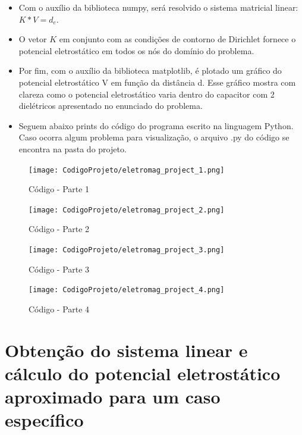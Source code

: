 \documentclass[10pt]{article}
\begin{document}
\begin{itemize}
    \item Com o auxílio da biblioteca numpy, será resolvido o sistema matricial linear: $K*V = d_{e}$.
    \item O vetor $K$ em conjunto com as condições de contorno de Dirichlet fornece o potencial eletrostático em todos os nós do domínio do problema.
    \item Por fim, com o auxílio da biblioteca matplotlib, é plotado um gráfico do potencial eletrostático V em função da distância d. Esse gráfico mostra com clareza como o potencial eletrostático varia dentro do capacitor com 2 dielétricos apresentado no enunciado do problema.
    \item Seguem abaixo prints do código do programa escrito na linguagem Python. Caso ocorra algum problema para visualização, o arquivo .py do código se encontra na pasta do projeto.
    \end{itemize}
    
    \begin{figure}[!htb]
    \centerline{\texttt{[image: CodigoProjeto/eletromag\_project\_1.png]}}
    \caption{Código - Parte 1}
    \label{fig:fp14}
    \end{figure}
    
    \begin{figure}[!htb]
    \centerline{\texttt{[image: CodigoProjeto/eletromag\_project\_2.png]}}
    \caption{Código - Parte 2}
    \label{fig:fp14}
    \end{figure}
    
    \begin{figure}[!htb]
    \centerline{\texttt{[image: CodigoProjeto/eletromag\_project\_3.png]}}
    \caption{Código - Parte 3}
    \label{fig:fp14}
    \end{figure}
    
    \begin{figure}[!htb]
    \centerline{\texttt{[image: CodigoProjeto/eletromag\_project\_4.png]}}
    \caption{Código - Parte 4}
    \label{fig:fp14}
    \end{figure}
    
\section{Obtenção do sistema linear e cálculo do potencial eletrostático aproximado para um caso específico}
    
\end{document}
